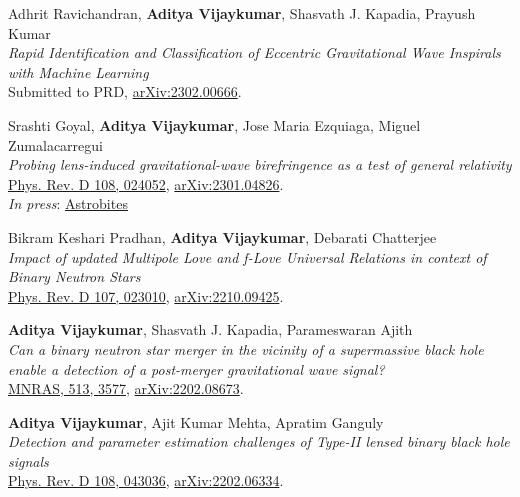 \begin{etaremune}
	\item
	Adhrit Ravichandran, \textbf{Aditya Vijaykumar}, Shasvath J. Kapadia, Prayush Kumar  \\
	\textit{Rapid Identification and Classification of Eccentric Gravitational Wave Inspirals with Machine Learning}\\
	Submitted to PRD, \href{https://arxiv.org/abs/2302.00666}{arXiv:2302.00666}.
	
	\item
	Srashti Goyal, \textbf{Aditya Vijaykumar}, Jose Maria Ezquiaga, Miguel Zumalacarregui \\
	\textit{Probing lens-induced gravitational-wave birefringence as a test of general relativity}\\
	\href{https://journals.aps.org/prd/abstract/10.1103/PhysRevD.108.024052}{Phys. Rev. D 108, 024052}, \href{https://arxiv.org/abs/2301.04826}{arXiv:2301.04826}.\\
    \textit{In press}: \href{https://astrobites.org/2023/04/11/gravitational-waves-a-la-general-relativity-or-scrambled/}{Astrobites}


    \item 
	Bikram Keshari Pradhan, \textbf{Aditya Vijaykumar}, Debarati Chatterjee \\
	\textit{Impact of updated Multipole Love and f-Love Universal Relations in context of Binary Neutron Stars}\\
	\href{https://journals.aps.org/prd/abstract/10.1103/PhysRevD.107.023010}{Phys. Rev. D 107, 023010}, \href{https://arxiv.org/abs/2210.09425}{arXiv:2210.09425}.
 
 \item 
	\textbf{Aditya Vijaykumar}, Shasvath J. Kapadia, Parameswaran Ajith\\
	\textit{Can a binary neutron star merger in the vicinity of a supermassive black hole enable a detection of a post-merger gravitational wave signal?}\\
	\href{https://academic.oup.com/mnras/article/513/3/3577/6573885}{MNRAS, 513, 3577}, \href{https://arxiv.org/abs/2202.08673}{arXiv:2202.08673}.
	
	\item \textbf{Aditya Vijaykumar}, Ajit Kumar Mehta, Apratim Ganguly\\
	\textit{Detection and parameter estimation challenges of Type-II lensed binary black hole signals}\\
	\href{https://journals.aps.org/prd/abstract/10.1103/PhysRevD.108.043036}{Phys. Rev. D 108, 043036}, \href{https://arxiv.org/abs/2202.06334}{arXiv:2202.06334}.


\end{etaremune}
